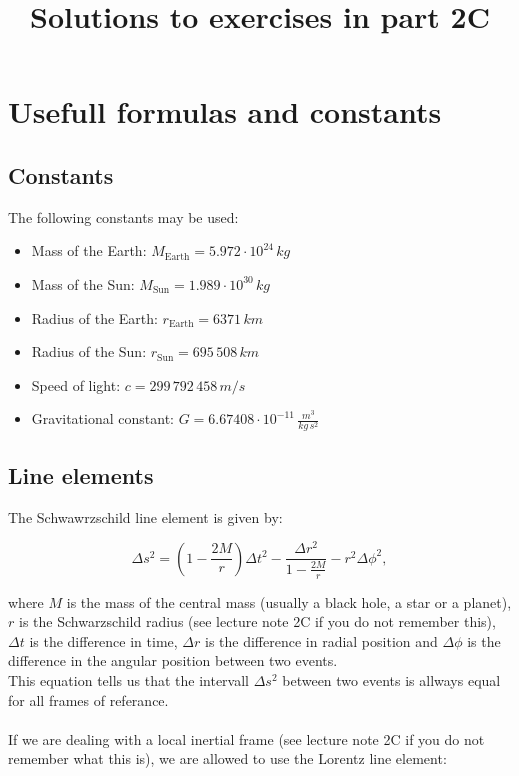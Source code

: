 \documentclass[a4paper,10pt,english]{article}
\begin{document}
\title{Solutions to exercises in part 2C}
\date{}
\maketitle
\tableofcontents
\clearpage

\section*{Usefull formulas and constants}

\subsection*{Constants}
The following constants may be used:
\begin{itemize}
\item Mass of the Earth:      $M_{\text{Earth}}=5.972\cdot10^{24}\,kg$ 
\item Mass of the Sun:        $M_{\text{Sun}}=1.989\cdot10^{30}\,kg$
\item Radius of the Earth:    $r_{\text{Earth}}=6371\,km$
\item Radius of the Sun:      $r_{\text{Sun}}=695\,508\,km$
\item Speed of light:         $c=299\,792\,458\,m/s$
\item Gravitational constant: $G=6.67408\cdot10^{-11}\,\frac{m^{3}}{kg\,s^{2}}$
\end{itemize}

\subsection*{Line elements}
The Schwawrzschild line element is given by:

\begin{equation}\label{eq:schwarzschild}
\Delta s^{2}=\left(1-\frac{2M}{r}\right)\Delta t^{2}-\frac{\Delta r^{2}}{1-\frac{2M}{r}}-r^{2}\Delta\phi^{2},
\end{equation}

where $M$ is the mass of the central mass %
(usually a black hole, a star or a planet), $r$ is the Schwarzschild radius (see lecture note 2C if you do not remember this), $\Delta t$ is the difference in time, $\Delta r$ is the difference in radial position and $\Delta\phi$ is the difference in the angular position between two events.
\\
This equation tells us that the intervall $\Delta s^{2}$ between two events is allways equal for all frames of referance.
\\
\\
If we are dealing with a local inertial frame (see lecture note 2C if you do not remember what this is), we are allowed to use the Lorentz line element:
\end{document}
